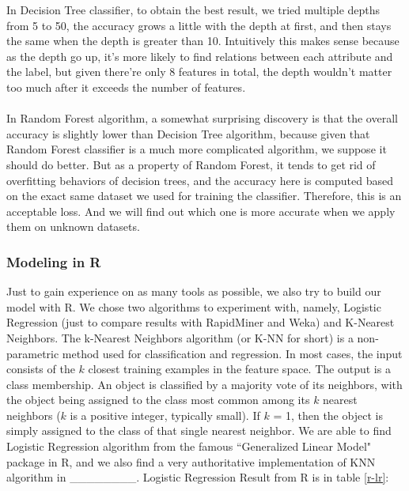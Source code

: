 \documentclass[CEJM,PDF]{cej} %
\begin{document}
In Decision Tree classifier, to obtain the best result, we tried multiple depths from 5 to 50, the accuracy grows a little with the depth at first, and then stays the same when the depth is greater than 10. Intuitively this makes sense because as the depth go up, it's more likely to find relations between each attribute and the label, but given there're only 8 features in total, the depth wouldn't matter too much after it exceeds the number of features.\\
\\
In Random Forest algorithm, a somewhat surprising discovery is that the overall accuracy is slightly lower than Decision Tree algorithm, because given that Random Forest classifier is a much more complicated algorithm, we suppose it should do better. But as a property of Random Forest, it tends to get rid of overfitting behaviors of decision trees, and the accuracy here is computed based on the exact same dataset we used for training the classifier. Therefore, this is an acceptable loss. And we will find out which one is more accurate when we apply them on unknown datasets.\\

\subsubsection{Modeling in R}
Just to gain experience on as many tools as possible, we also try to build our model with R. We chose two algorithms to experiment with, namely, Logistic Regression (just to compare results with RapidMiner and Weka) and K-Nearest Neighbors. The k-Nearest Neighbors algorithm (or K-NN for short) is a non-parametric method used for classification and regression. In most cases, the input consists of the $k$ closest training examples in the feature space. The output is a class membership. An object is classified by a majority vote of its neighbors, with the object being assigned to the class most common among its $k$ nearest neighbors ($k$ is a positive integer, typically small). If $k$ = 1, then the object is simply assigned to the class of that single nearest neighbor. We are able to find Logistic Regression algorithm from the famous ``Generalized Linear Model" package in R, and we also find a very authoritative implementation of KNN algorithm in \_\_\_\_\_\_\_\_. Logistic Regression Result from R is in table \ref{r-lr}:\\
\end{document}
